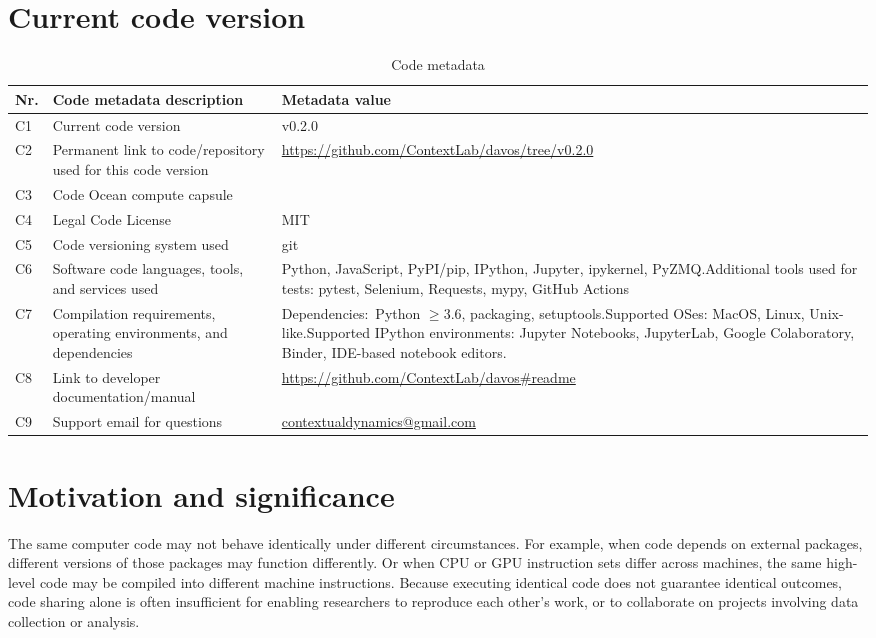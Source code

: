 \documentclass[preprint,12pt,a4paper]{elsarticle}
\begin{document}
\section*{Current code version}

\begin{table}[H]
\begin{tabular}{|l|p{6.5cm}|p{6.5cm}|}
\hline
\textbf{Nr.} & \textbf{Code metadata description} & \textbf{Metadata value} \\
\hline
C1 & Current code version &  v0.2.0 \\
\hline
C2 & Permanent link to code/repository used for this code version & \url{https://github.com/ContextLab/davos/tree/v0.2.0} \\
\hline
C3 & Code Ocean compute capsule & \\
\hline
C4 & Legal Code License & MIT \\
\hline
C5 & Code versioning system used & git \\
\hline
C6 & Software code languages, tools, and services used & Python, JavaScript, PyPI/pip, IPython, Jupyter, ipykernel, PyZMQ.\newline Additional tools used for tests: pytest, Selenium, Requests, mypy, GitHub Actions \\
\hline
C7 & Compilation requirements, operating environments, and
     dependencies & Dependencies:~Python $\geq 3.6$, packaging, setuptools.\newline Supported OSes: MacOS, Linux, Unix-like.\newline Supported IPython environments: Jupyter Notebooks, JupyterLab, Google Colaboratory, Binder, IDE-based notebook editors. \\
\hline
C8 & Link to developer documentation/manual & \url{https://github.com/ContextLab/davos\#readme} \\
\hline
C9 & Support email for questions & \href{mailto:contextualdynamics@gmail.com}{contextualdynamics@gmail.com} \\
\hline
\end{tabular}
\caption{Code metadata}
\label{}
\end{table}

\linenumbers

\section{Motivation and significance}

The same computer code may not behave identically under different
circumstances.  For example, when code depends on external packages,
different versions of those packages may function differently.  Or
when CPU or GPU instruction sets differ across machines, the same
high-level code may be compiled into different machine instructions.
Because executing identical code does not guarantee identical
outcomes, code sharing alone is often insufficient for enabling
researchers to reproduce each other's work, or to collaborate on
projects involving data collection or analysis.
\end{document}
